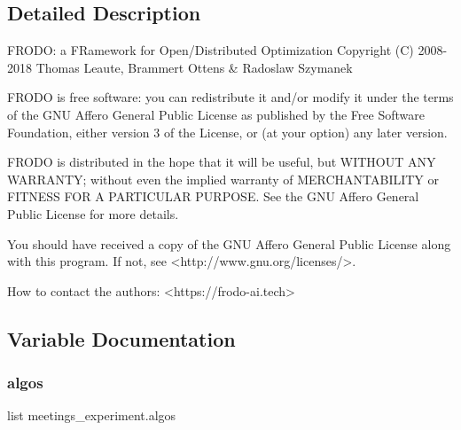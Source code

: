 \subsection{Detailed Description}
\begin{DoxyVerb}FRODO: a FRamework for Open/Distributed Optimization
Copyright (C) 2008-2018  Thomas Leaute, Brammert Ottens & Radoslaw Szymanek

FRODO is free software: you can redistribute it and/or modify
it under the terms of the GNU Affero General Public License as published by
the Free Software Foundation, either version 3 of the License, or
(at your option) any later version.

FRODO is distributed in the hope that it will be useful,
but WITHOUT ANY WARRANTY; without even the implied warranty of
MERCHANTABILITY or FITNESS FOR A PARTICULAR PURPOSE.  See the
GNU Affero General Public License for more details.

You should have received a copy of the GNU Affero General Public License
along with this program.  If not, see <http://www.gnu.org/licenses/>.


How to contact the authors: 
<https://frodo-ai.tech>
\end{DoxyVerb}
 

\subsection{Variable Documentation}
\mbox{\label{namespacemeetings__experiment_a074f5746ecf90968184c1678fb7dd144}} 
\subsubsection{\texorpdfstring{algos}{algos}}
{\footnotesize\ttfamily list meetings\+\_\+experiment.\+algos}

